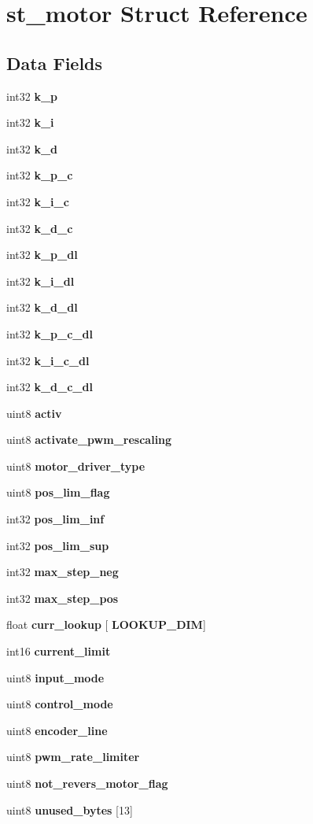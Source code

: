 \section{st\+\_\+motor Struct Reference}
\label{structst__motor}
\subsection*{Data Fields}
\begin{DoxyCompactItemize}
\item 
int32 \textbf{ k\+\_\+p}
\item 
int32 \textbf{ k\+\_\+i}
\item 
int32 \textbf{ k\+\_\+d}
\item 
int32 \textbf{ k\+\_\+p\+\_\+c}
\item 
int32 \textbf{ k\+\_\+i\+\_\+c}
\item 
int32 \textbf{ k\+\_\+d\+\_\+c}
\item 
int32 \textbf{ k\+\_\+p\+\_\+dl}
\item 
int32 \textbf{ k\+\_\+i\+\_\+dl}
\item 
int32 \textbf{ k\+\_\+d\+\_\+dl}
\item 
int32 \textbf{ k\+\_\+p\+\_\+c\+\_\+dl}
\item 
int32 \textbf{ k\+\_\+i\+\_\+c\+\_\+dl}
\item 
int32 \textbf{ k\+\_\+d\+\_\+c\+\_\+dl}
\item 
uint8 \textbf{ activ}
\item 
uint8 \textbf{ activate\+\_\+pwm\+\_\+rescaling}
\item 
uint8 \textbf{ motor\+\_\+driver\+\_\+type}
\item 
uint8 \textbf{ pos\+\_\+lim\+\_\+flag}
\item 
int32 \textbf{ pos\+\_\+lim\+\_\+inf}
\item 
int32 \textbf{ pos\+\_\+lim\+\_\+sup}
\item 
int32 \textbf{ max\+\_\+step\+\_\+neg}
\item 
int32 \textbf{ max\+\_\+step\+\_\+pos}
\item 
float \textbf{ curr\+\_\+lookup} [\textbf{ L\+O\+O\+K\+U\+P\+\_\+\+D\+IM}]
\item 
int16 \textbf{ current\+\_\+limit}
\item 
uint8 \textbf{ input\+\_\+mode}
\item 
uint8 \textbf{ control\+\_\+mode}
\item 
uint8 \textbf{ encoder\+\_\+line}
\item 
uint8 \textbf{ pwm\+\_\+rate\+\_\+limiter}
\item 
uint8 \textbf{ not\+\_\+revers\+\_\+motor\+\_\+flag}
\item 
uint8 \textbf{ unused\+\_\+bytes} [13]
\end{DoxyCompactItemize}


